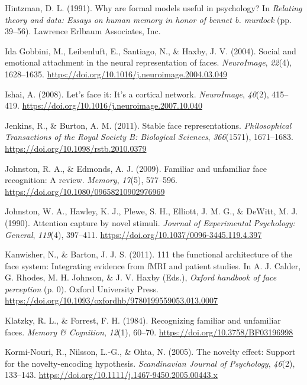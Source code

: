 \documentclass[
  letterpaper,
  DIV=11,
  numbers=noendperiod]{scrartcl}
\newlength{\cslhangindent}
\newenvironment{CSLReferences}[2] %
 {\begin{list}{}{%
  \setlength{\itemindent}{0pt}
  \setlength{\leftmargin}{0pt}
  \setlength{\parsep}{0pt}
  \ifodd #1
   \setlength{\leftmargin}{\cslhangindent}
   \setlength{\itemindent}{-1\cslhangindent}
  \fi
  \setlength{\itemsep}{#2\baselineskip}}}
 {\end{list}}
\begin{document}
\begin{CSLReferences}{1}{0}
Hintzman, D. L. (1991). Why are formal models useful in psychology? In
\emph{Relating theory and data: Essays on human memory in honor of
bennet b. murdock} (pp. 39--56). Lawrence Erlbaum Associates, Inc.

Ida Gobbini, M., Leibenluft, E., Santiago, N., \& Haxby, J. V. (2004).
Social and emotional attachment in the neural representation of faces.
\emph{NeuroImage}, \emph{22}(4), 1628--1635.
\url{https://doi.org/10.1016/j.neuroimage.2004.03.049}

Ishai, A. (2008). Let's face it: It's a cortical network.
\emph{NeuroImage}, \emph{40}(2), 415--419.
\url{https://doi.org/10.1016/j.neuroimage.2007.10.040}

Jenkins, R., \& Burton, A. M. (2011). Stable face representations.
\emph{Philosophical Transactions of the Royal Society B: Biological
Sciences}, \emph{366}(1571), 1671--1683.
\url{https://doi.org/10.1098/rstb.2010.0379}

Johnston, R. A., \& Edmonds, A. J. (2009). Familiar and unfamiliar face
recognition: A review. \emph{Memory}, \emph{17}(5), 577--596.
\url{https://doi.org/10.1080/09658210902976969}

Johnston, W. A., Hawley, K. J., Plewe, S. H., Elliott, J. M. G., \&
DeWitt, M. J. (1990). Attention capture by novel stimuli. \emph{Journal
of Experimental Psychology: General}, \emph{119}(4), 397--411.
\url{https://doi.org/10.1037/0096-3445.119.4.397}

Kanwisher, N., \& Barton, J. J. S. (2011). 111 the functional
architecture of the face system: Integrating evidence from fMRI and
patient studies. In A. J. Calder, G. Rhodes, M. H. Johnson, \& J. V.
Haxby (Eds.), \emph{Oxford handbook of face perception} (p. 0). Oxford
University Press.
\url{https://doi.org/10.1093/oxfordhb/9780199559053.013.0007}

Klatzky, R. L., \& Forrest, F. H. (1984). Recognizing familiar and
unfamiliar faces. \emph{Memory \& Cognition}, \emph{12}(1), 60--70.
\url{https://doi.org/10.3758/BF03196998}

Kormi-Nouri, R., Nilsson, L.-G., \& Ohta, N. (2005). The novelty effect:
Support for the novelty-encoding hypothesis. \emph{Scandinavian Journal
of Psychology}, \emph{46}(2), 133--143.
\url{https://doi.org/10.1111/j.1467-9450.2005.00443.x}


\end{CSLReferences}
\end{document}

